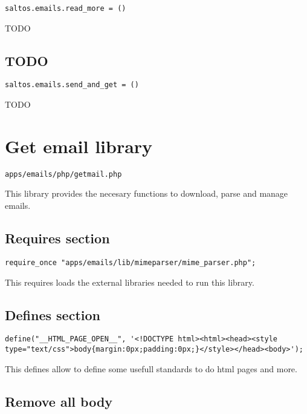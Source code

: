 \documentclass[a4paper]{book}
\begin{document}
\begin{lstlisting}
saltos.emails.read_more = ()
\end{lstlisting}

TODO

\hypertarget{toc527}{}
\subsection{TODO}

\begin{lstlisting}
saltos.emails.send_and_get = ()
\end{lstlisting}

TODO

\hypertarget{toc528}{}
\section{Get email library}

\begin{lstlisting}
apps/emails/php/getmail.php
\end{lstlisting}

This library provides the necesary functions to download, parse and manage emails.

\hypertarget{toc529}{}
\subsection{Requires section}

\begin{lstlisting}
require_once "apps/emails/lib/mimeparser/mime_parser.php";
\end{lstlisting}

This requires loads the external libraries needed to run this library.

\hypertarget{toc530}{}
\subsection{Defines section}

\begin{lstlisting}
define("__HTML_PAGE_OPEN__", '<!DOCTYPE html><html><head><style type="text/css">body{margin:0px;padding:0px;}</style></head><body>');
\end{lstlisting}

This defines allow to define some usefull standards to do html pages and more.

\hypertarget{toc531}{}
\subsection{Remove all body}
\end{document}
